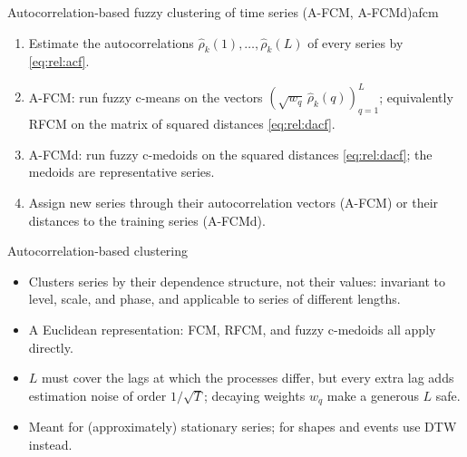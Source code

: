 \begin{algobox}{Autocorrelation-based fuzzy clustering of time series (A-FCM, A-FCMd)}{afcm}
\begin{enumerate}[leftmargin=*]
  \item Estimate the autocorrelations $\hat\rho_k(1),\dots,\hat\rho_k(L)$ of every series by \eqref{eq:rel:acf}.
  \item A-FCM: run fuzzy c-means on the vectors $(\sqrt{w_q}\,\hat\rho_k(q))_{q=1}^{L}$; equivalently RFCM on the matrix of squared distances \eqref{eq:rel:dacf}.
  \item A-FCMd: run fuzzy c-medoids on the squared distances \eqref{eq:rel:dacf}; the medoids are representative series.
  \item Assign new series through their autocorrelation vectors (A-FCM) or their distances to the training series (A-FCMd).
\end{enumerate}
\end{algobox}
\begin{summarybox}{Autocorrelation-based clustering}
\begin{itemize}
  \item Clusters series by their dependence structure, not their values: invariant to level, scale, and phase, and applicable to series of different lengths.
  \item A Euclidean representation: FCM, RFCM, and fuzzy c-medoids all apply directly.
  \item $L$ must cover the lags at which the processes differ, but every extra lag adds estimation noise of order $1/\sqrt{T}$; decaying weights $w_q$ make a generous $L$ safe.
  \item Meant for (approximately) stationary series; for shapes and events use DTW instead.
\end{itemize}
\end{summarybox}


